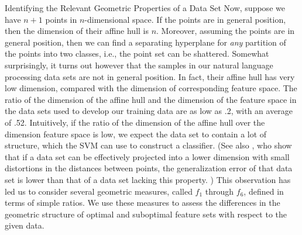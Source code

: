 \documentclass{llncs}
\begin{document}
\begin{section}{Identifying the Relevant Geometric Properties of a Data Set}
Now, suppose we have $n+1$ points in $n$-dimensional space. If the points are in general position, then the dimension of their affine hull is $n$. Moreover, assuming the points are in general position, then we can find a separating hyperplane for {\em any} partition of the points into two classes, i.e., the point set can be shattered. Somewhat surprisingly, it turns out however that the samples in our natural language processing data sets are not in general position. In fact, their affine hull has very low dimension, compared with the dimension of corresponding feature space. The ratio of the dimension of the affine hull and the dimension of the feature space in the data sets used to develop our training data are as low as .2, with an average of .52. Intuitively, if the ratio of the dimension of the affine hull over the dimension feature space is low, we expect the data set to contain a lot of structure, which the SVM can use to construct a classifier. (See also \cite{Garg,Bradley}, who show that if a data set can be effectively projected into a lower dimension with small distortions in the distances between points, the generalization error of that data set is lower than that of a data set lacking this property. ) This observation has led us to consider several geometric measures, called $f_1$ through $f_6$, defined in terms of simple ratios. We use these measures to assess the differences in the geometric structure of optimal and suboptimal feature sets with respect to the given data. 


\end{section}
\end{document}
